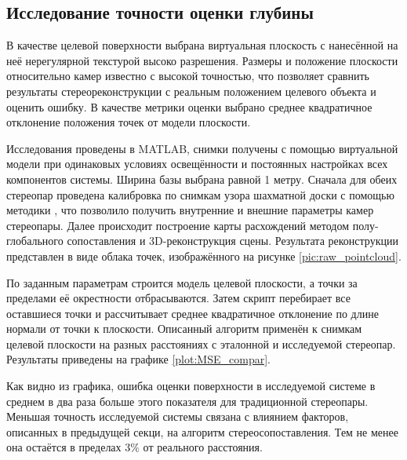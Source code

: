 
\subsection{Исследование точности оценки глубины}  %

В качестве целевой поверхности выбрана виртуальная плоскость с нанесённой на неё нерегулярной текстурой высоко разрешения. Размеры и
положение плоскости относительно камер известно с высокой точностью, что позволяет сравнить результаты стереореконструкции
с реальным положением целевого объекта и оценить ошибку. В качестве метрики оценки выбрано среднее квадратичное отклонение
положения точек от модели плоскости. 

Исследования проведены в MATLAB, снимки получены с помощью виртуальной модели при  одинаковых условиях освещённости и 
постоянных  настройках всех  компонентов системы.  Ширина базы выбрана равной 1  метру.  Сначала для обеих стереопар 
проведена калибровка по снимкам узора шахматной доски с помощью методики \cite{stereo_calib}, что позволило получить 
внутренние и внешние параметры камер стереопары. %
Далее происходит построение карты расхождений методом полу-глобального  сопоставления \cite{SGBM} и 3D-реконструкция сцены. 
Результата реконструкции представлен  в виде облака точек,  изображённого на рисунке \ref{pic:raw_pointcloud}.

По заданным параметрам строится модель целевой плоскости, а точки за пределами её окрестности отбрасываются. %
Затем скрипт перебирает все оставшиеся точки и рассчитывает среднее квадратичное отклонение по длине нормали от 
точки к плоскости. 
Описанный алгоритм применён к снимкам целевой плоскости на разных расстояниях с эталонной и исследуемой стереопар.
Результаты приведены на графике \ref{plot:MSE_compar}.


Как видно из графика, ошибка оценки поверхности в исследуемой системе в среднем в два раза больше этого показателя для
традиционной стереопары. Меньшая точность исследуемой системы связана с влиянием факторов, описанных в предыдущей секци,
на алгоритм стереосопоставления.  Тем не менее она остаётся в пределах $3\%$ от реального расстояния.  %


%